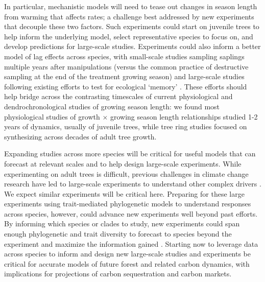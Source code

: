 \documentclass[11pt]{article}
\begin{document}
In particular, mechanistic models will need to tease out changes in season length from warming that affects rates; a challenge best addressed by new experiments that decouple these two factors. Such experiments could start on juvenile trees to help inform the underlying model, select representative species to focus on, and  develop predictions for large-scale studies. Experiments could also inform a better model of lag effects across species, with small-scale studies sampling saplings multiple years after manipulations (versus the common practice of destructive sampling at the end of the treatment growing season) and large-scale studies following existing efforts to test for ecological `memory'  \citep[e.g. ][]{flinker2021promise,schweiger2022transgenerational,chinmemory}. These efforts should help bridge across the contrasting timescales of current physiological and dendrochronological studies of growing season length: we found most physiological studies of growth $\times$ growing season length relationships studied 1-2 years of dynamics, usually of juvenile trees, while tree ring studies focused on synthesizing across decades of adult tree growth.

Expanding studies across more species will be critical for useful models that can forecast at relevant scales and to help design large-scale experiments. While experimenting on adult trees is difficult, previous challenges in climate change research have led to large-scale experiments to understand other complex drivers \citep[e.g. SPRUCE, DroughtNet, Pfynwald,][]{norby2011ecological,hanson2017attaining,smith2016drought}. We expect similar experiments will be critical here. Preparing for these large experiments using trait-mediated phylogenetic models to understand responses across species, however, could advance new experiments well beyond past efforts. By informing which species or clades to study, new experiments could span enough phylogenetic and trait diversity to forecast to species beyond the experiment and maximize the information gained \citep{cadotte2017phylogenies}. Starting now to leverage data across species to inform and design new large-scale studies and experiments be critical for accurate models of future forest and related carbon dynamics, with implications for projections of carbon sequestration and carbon markets. 

 
\end{document}
